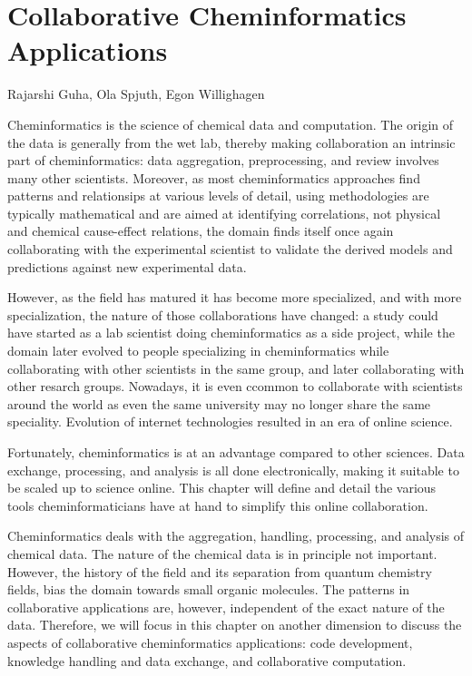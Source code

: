 \documentclass[11pt]{book}
\begin{document}
\chapter{Collaborative Cheminformatics Applications}

\begin{LARGE}
Rajarshi Guha, Ola Spjuth, Egon Willighagen
\end{LARGE}
\vspace{1.5cm}

Cheminformatics is the science of chemical data and computation.  The
origin of the data is generally from the wet lab,
thereby making collaboration an intrinsic part of cheminformatics:
data aggregation, preprocessing, and review involves many other
scientists. Moreover, as most cheminformatics approaches find
patterns and relationsips at various levels of detail, using
methodologies are typically mathematical and are
aimed at identifying correlations, not physical and chemical
cause-effect relations, the domain finds itself once
again collaborating with the experimental scientist to validate
the derived models and predictions against new experimental data.

However, as the field has matured it has become more specialized,
and with more specialization, the nature of those collaborations
have changed: a study could have started as a lab scientist doing
cheminformatics as a side project, while the domain later evolved to people
specializing in cheminformatics while collaborating with other
scientists in the same group, and later collaborating with other
resarch groups. Nowadays, it is even ccommon to collaborate with
scientists around the world as even the same university may no
longer share the same speciality. Evolution of internet technologies
resulted in an era of online science.

Fortunately, cheminformatics is at an advantage compared to
other sciences. Data exchange, processing, and analysis
is all done electronically, making it suitable to be
scaled up to science online. This chapter will define and detail the
various tools cheminformaticians have at hand to simplify
this online collaboration.

Cheminformatics deals with the aggregation, handling, processing, and
analysis of chemical data. The nature of the chemical data is in principle
not important. However, the history of the field and its separation from
quantum chemistry fields, bias the domain towards small organic molecules.
The patterns in collaborative applications are, however, independent of
the exact nature of the data. Therefore, we will focus in this chapter
on another dimension to discuss the aspects of collaborative
cheminformatics applications: code development, knowledge handling
and data exchange, and collaborative computation.
\end{document}

